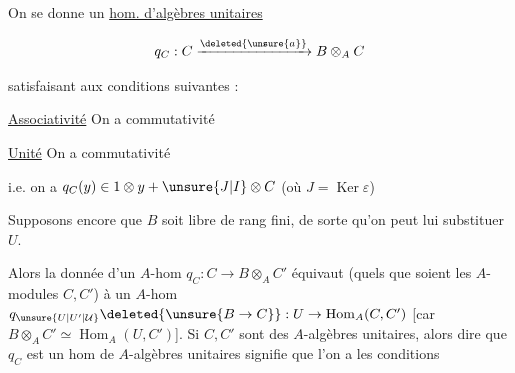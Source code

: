 

On se donne un \uline{hom. d'algèbres unitaires}

\[
q_C:C\xrightarrow{\deleted{\unsure{a}}}B\otimes_A C
\]

satisfaisant aux conditions suivantes :

\uline{Associativité} On a commutativité 


\uline{Unité} On a commutativité 


i.e. on a $q_C(y)\in1\otimes y+\unsure{J|I}\otimes C$ (où $J=\operatorname{Ker}\varepsilon$)

Supposons encore que $B$ soit libre de rang fini, de sorte qu'on peut lui substituer $U$.

Alors la donnée d'un $A$-hom $q_C:C\to B\otimes_A C'$ équivaut (quels que soient les $A$-modules $C,C'$) à un $A$-hom $q_{\unsure{U|U'|\mathcal{U}}}\deleted{\unsure{B\to C}}:U\to\operatorname{Hom}_A(C,C')$ [car $B\otimes_A C'\simeq\operatorname{Hom}_A(U,C')$]. Si $C,C'$ sont des $A$-algèbres unitaires, alors dire que $q_C$ est un hom de $A$-algèbres unitaires signifie que l'on a les conditions
